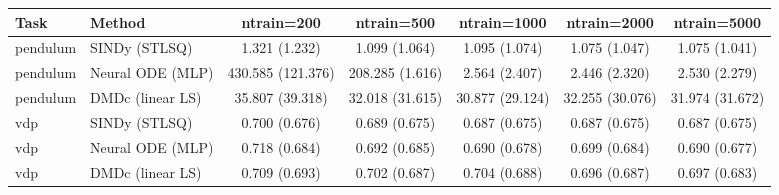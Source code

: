 \begin{tabular}{llccccc}\toprule
Task & Method & ntrain=200 & ntrain=500 & ntrain=1000 & ntrain=2000 & ntrain=5000 \\\midrule
pendulum & SINDy (STLSQ) & 1.321 (1.232) & 1.099 (1.064) & 1.095 (1.074) & 1.075 (1.047) & 1.075 (1.041) \\
pendulum & Neural ODE (MLP) & 430.585 (121.376) & 208.285 (1.616) & 2.564 (2.407) & 2.446 (2.320) & 2.530 (2.279) \\
pendulum & DMDc (linear LS) & 35.807 (39.318) & 32.018 (31.615) & 30.877 (29.124) & 32.255 (30.076) & 31.974 (31.672) \\
vdp & SINDy (STLSQ) & 0.700 (0.676) & 0.689 (0.675) & 0.687 (0.675) & 0.687 (0.675) & 0.687 (0.675) \\
vdp & Neural ODE (MLP) & 0.718 (0.684) & 0.692 (0.685) & 0.690 (0.678) & 0.699 (0.684) & 0.690 (0.677) \\
vdp & DMDc (linear LS) & 0.709 (0.693) & 0.702 (0.687) & 0.704 (0.688) & 0.696 (0.687) & 0.697 (0.683) \\
\bottomrule\end{tabular}
